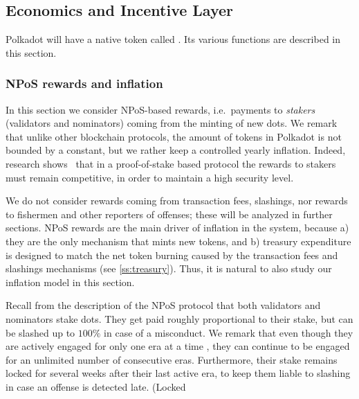 \subsection{Economics and Incentive Layer}\label{sec:economics}

Polkadot will have a native token called . Its various functions are described in this section.



\subsubsection{NPoS rewards and inflation}

In this section we consider NPoS-based rewards, i.e.~payments to \emph{stakers} (validators and nominators) 
coming from the minting of new dots. 
We remark that unlike other blockchain protocols, the amount of tokens in Polkadot is not bounded by a constant, but we rather keep a controlled yearly inflation. Indeed, research shows~\cite{chitra2019competitive} that in a proof-of-stake based protocol the rewards to stakers must remain competitive, in order to maintain a high security level. 

We do not consider rewards coming from transaction fees, slashings, nor rewards to fishermen 
and other reporters of offenses; these will be analyzed in further sections. 
NPoS rewards are the main driver of inflation in the system, because 
a) they are the only mechanism that mints new tokens, and b) treasury expenditure is designed to match 
the net token burning caused by the transaction fees and slashings mechanisms (see \autoref{ss:treasury}). 
Thus, it is natural to also study our inflation model in this section.

Recall from the description of the NPoS protocol that both validators and nominators stake dots. 
They get paid roughly proportional to their stake, but can be slashed up to $100\%$ in case of a misconduct. 
We remark that even though they are actively engaged for only one era at a time , 
they can continue to be engaged for an unlimited number of consecutive eras. 
Furthermore, their stake remains locked for several weeks after their last active era, 
to keep them liable to slashing in case an offense is detected late. (Locked 
\alfonso{}{}

